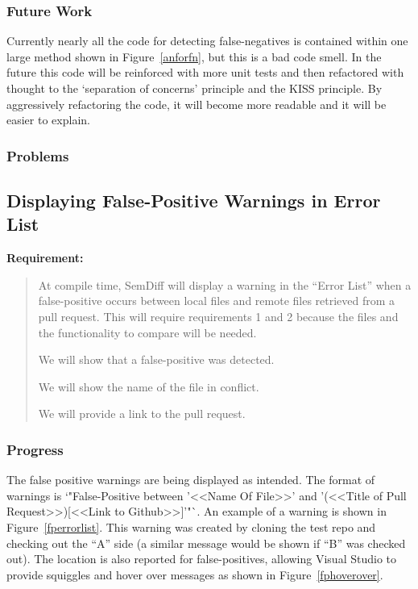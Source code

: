 \documentclass[draftclsnofoot,onecolumn]{IEEEtran}
\begin{document}
\subsubsection{Future Work}

Currently nearly all the code for detecting false-negatives is contained 
within one large method shown in Figure~\ref{anforfn}, but this is a bad code 
smell. In the future this code will be reinforced with more unit tests and 
then refactored with thought to the ‘separation of concerns’ principle and 
the KISS principle. By aggressively refactoring the code, it will become more 
readable and it will be easier to explain.

\subsubsection{Problems}






\subsection{Displaying False-Positive Warnings in Error List}

\textbf{Requirement:}

\begin{quote}

At compile time, SemDiff will display a warning in the “Error List” when a 
false-positive occurs between local files and remote files retrieved from a 
pull request. This will require requirements 1 and 2 because the files and 
the functionality to compare will be needed.

We will show that a false-positive was detected.

We will show the name of the file in conflict.

We will provide a link to the pull request.

\end{quote}

\subsubsection{Progress}

The false positive warnings are being displayed as intended. The format of 
warnings is `"False-Positive between '<<Name Of File>>' and '(<<Title of Pull Request>>)[<<Link to Github>>]'"`. An example of a warning is shown in 
Figure~\ref{fperrorlist}. This warning was created by cloning the test repo 
and checking out the “A” side (a similar message would be shown if “B” was 
checked out). The location is also reported for false-positives, allowing 
Visual Studio to provide squiggles and hover over messages as shown in 
Figure~\ref{fphoverover}.
\end{document}
